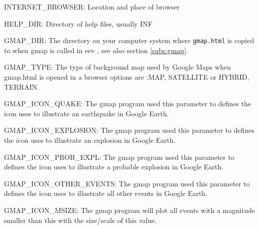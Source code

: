 %
%
%
%
%
%
%

INTERNET\_BROWSER: Location and place of browser 

HELP\_DIR: Directory of help files, usually INF 

\label{ref:gmap.par}
GMAP\_DIR: The directory on your computer system where \texttt{gmap.html} is copied to when gmap is 
called in eev , see also section \ref{subs:gmap}. 

GMAP\_TYPE: The type of background map used by Google Maps when gmap.html is 
opened in a browser options are :MAP, SATELLITE or HYBRID, TERRAIN. 


GMAP\_ICON\_QUAKE: The gmap program used this parameter to defines the icon uses to illustrate 
an earthquake in Google Earth. 

GMAP\_ICON\_EXPLOSION: The gmap program used this parameter to defines 
the icon uses to illustrate an explosion in Google Earth. 

GMAP\_ICON\_PROB\_EXPL: The gmap program used this parameter to defines the icon uses to 
illustrate a probable explosion in Google Earth. 

GMAP\_ICON\_OTHER\_EVENTS: The gmap program used this parameter to defines 
the icon uses to illustrate all other events in Google Earth. 

GMAP\_ICON\_MSIZE: The gmap program will plot all events with a magnitude smaller than this with the 
size/scale of this value.

